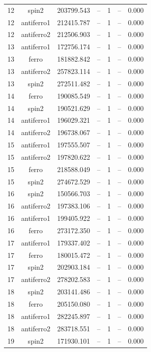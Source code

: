 \begin{longtable}{@{}ccrrrrr@{}}
12 & spin2 & 203799.543 & -- & 1 & -- & 0.000 \\
12 & antiferro1 & 212415.787 & -- & 1 & -- & 0.000 \\
12 & antiferro2 & 212506.903 & -- & 1 & -- & 0.000 \\
\rowcolor{gray!20} 13 & antiferro1 & 172756.174 & -- & 1 & -- & 0.000 \\
13 & ferro & 181882.842 & -- & 1 & -- & 0.000 \\
13 & antiferro2 & 257823.114 & -- & 1 & -- & 0.000 \\
13 & spin2 & 272511.482 & -- & 1 & -- & 0.000 \\
\rowcolor{gray!20} 14 & ferro & 190085.549 & -- & 1 & -- & 0.000 \\
14 & spin2 & 190521.629 & -- & 1 & -- & 0.000 \\
14 & antiferro1 & 196029.321 & -- & 1 & -- & 0.000 \\
14 & antiferro2 & 196738.067 & -- & 1 & -- & 0.000 \\
\rowcolor{gray!20} 15 & antiferro1 & 197555.507 & -- & 1 & -- & 0.000 \\
15 & antiferro2 & 197820.622 & -- & 1 & -- & 0.000 \\
15 & ferro & 218588.049 & -- & 1 & -- & 0.000 \\
15 & spin2 & 274672.529 & -- & 1 & -- & 0.000 \\
\rowcolor{gray!20} 16 & spin2 & 150566.703 & -- & 1 & -- & 0.000 \\
16 & antiferro2 & 197383.106 & -- & 1 & -- & 0.000 \\
16 & antiferro1 & 199405.922 & -- & 1 & -- & 0.000 \\
16 & ferro & 273172.350 & -- & 1 & -- & 0.000 \\
\rowcolor{gray!20} 17 & antiferro1 & 179337.402 & -- & 1 & -- & 0.000 \\
17 & ferro & 180015.472 & -- & 1 & -- & 0.000 \\
17 & spin2 & 202903.184 & -- & 1 & -- & 0.000 \\
17 & antiferro2 & 278202.583 & -- & 1 & -- & 0.000 \\
\rowcolor{gray!20} 18 & spin2 & 203141.486 & -- & 1 & -- & 0.000 \\
18 & ferro & 205150.080 & -- & 1 & -- & 0.000 \\
18 & antiferro1 & 282245.897 & -- & 1 & -- & 0.000 \\
18 & antiferro2 & 283718.551 & -- & 1 & -- & 0.000 \\
\rowcolor{gray!20} 19 & spin2 & 171930.101 & -- & 1 & -- & 0.000 \\

\end{longtable}
